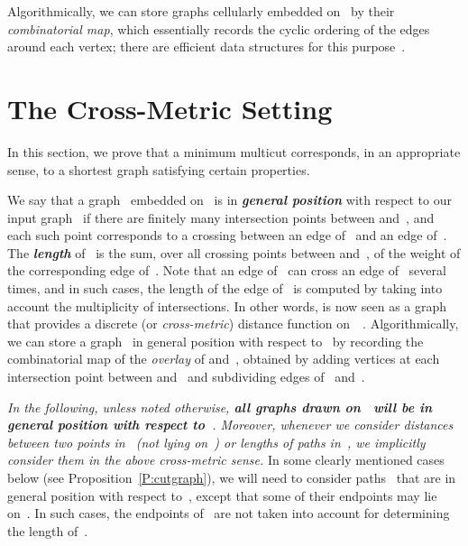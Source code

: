 \documentclass[11pt]{article}
\newcommand{\emphdef}[1]{\textcolor{blueblack}{\textbf{\emph{#1}}}}
\theoremstyle{plain}  \newtheorem{theorem}{Theorem}[section]
\theoremstyle{definition}
\begin{document}
Algorithmically, we can store graphs cellularly embedded on~ by their
\emph{combinatorial map}, which essentially records the cyclic ordering of
the edges around each vertex; there are efficient data structures for this
purpose~\cite{e-dgteg-03,l-gem-82}.

\section{The Cross-Metric Setting}\label{S:cross-metric}

In this section, we prove that a minimum multicut corresponds, in an
appropriate sense, to a shortest graph satisfying certain properties.

We say that a graph~ embedded on~ is in \emphdef{general position}
with respect to our input graph~ if there are finitely many intersection
points between  and~, and each such point corresponds to a crossing
between an edge of~ and an edge of~.  The \emphdef{length} of~ is
the sum, over all crossing points between  and~, of the weight of the
corresponding edge of~.  Note that an edge of~ can cross an edge
of~ several times, and in such cases, the length of the edge of~ is
computed by taking into account the multiplicity of intersections.
In other words,  is now seen as a graph that
provides a discrete (or \emph{cross-metric}) distance function
on~~\cite{ce-tnpcs-10}.  Algorithmically, we can store a graph~ in
general position with respect to~ by recording the combinatorial map of
the \emph{overlay} of  and~, obtained by adding vertices at each
intersection point between  and~ and subdividing edges of~
and~.

\emph{In the following, unless noted otherwise, \textbf{all graphs drawn
    on~ will be in general position with respect to~}.
  Moreover, whenever we consider distances between two points in~ (not
  lying on~) or lengths of paths in~, we implicitly consider them in
  the above cross-metric sense.}  In some clearly mentioned cases below
(see Proposition~\ref{P:cutgraph}), we will need to consider paths~ that
are in general position with respect to~, except that some of their
endpoints may lie on~.  In such cases, the endpoints of~ are not
taken into account for determining the length of~.
\end{document}
